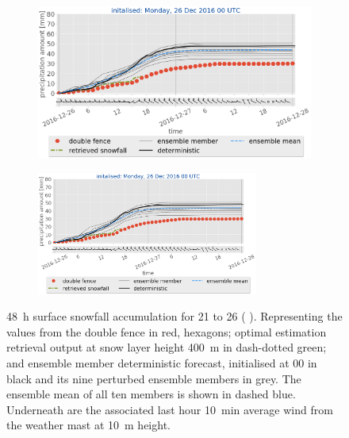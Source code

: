 \begin{figure}[t!]
\begin{subfigure}[t]{0.49\textwidth}
		\caption{}\label{fig:sfc_acc25}
	\end{subfigure}
	\begin{subfigure}[t]{0.49\textwidth}	\includegraphics[trim={0.cm 3.6cm 0.cm 0cm},clip,width=\textwidth]{./fig_sfc_acc/acc_wind_20161226_00}
		\caption{}\label{fig:sfc_acc26}
	\end{subfigure}
	
	\begin{subfigure}[t]{\textwidth}
		\centering
		\includegraphics[trim={1.2cm 0cm 1.1cm 21.4cm},clip,width=0.8\textwidth]{./fig_sfc_acc/acc_wind_20161226_00}
	\end{subfigure}
	\caption{\SI{48}{\hour} surface snowfall accumulation for \num{21} to \SI{26}{\dec} (\protect{}  \protect{}). Representing the values from the double fence in red, hexagons; optimal estimation retrieval output at snow layer height \SI{400}{\metre} in dash-dotted green; and ensemble member deterministic forecast, initialised at \SI{00}{\UTC} in black and its nine perturbed ensemble members in grey. The ensemble mean of all ten members is shown in dashed blue. Underneath are the associated last hour \SI{10}{\minute} average wind from the weather mast at \SI{10}{\metre} height. }\label{fig:sfc_acc}
\end{figure}
